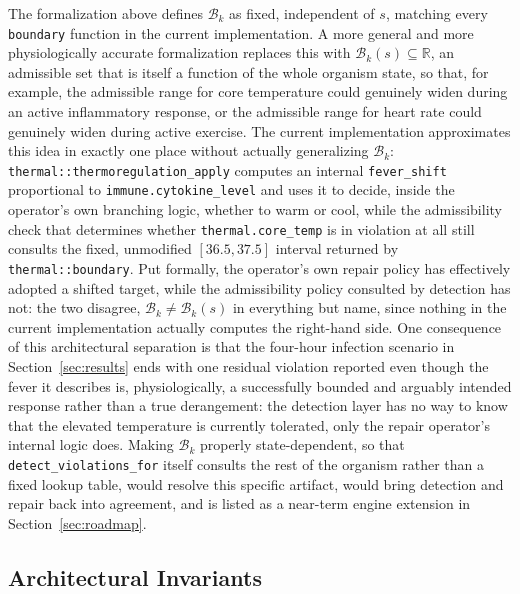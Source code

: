 \documentclass[11pt]{article}
\begin{document}
The formalization above defines $\mathcal B_k$ as fixed, independent of $s$, matching every \texttt{boundary} function in the current implementation. A more general and more physiologically accurate formalization replaces this with $\mathcal B_k(s) \subseteq \mathbb R$, an admissible set that is itself a function of the whole organism state, so that, for example, the admissible range for core temperature could genuinely widen during an active inflammatory response, or the admissible range for heart rate could genuinely widen during active exercise. The current implementation approximates this idea in exactly one place without actually generalizing $\mathcal B_k$: \texttt{thermal::thermoregulation\_apply} computes an internal \texttt{fever\_shift} proportional to \texttt{immune.cytokine\_level} and uses it to decide, inside the operator's own branching logic, whether to warm or cool, while the admissibility check that determines whether \texttt{thermal.core\_temp} is in violation at all still consults the fixed, unmodified $[36.5, 37.5]$ interval returned by \texttt{thermal::boundary}. Put formally, the operator's own repair policy has effectively adopted a shifted target, while the admissibility policy consulted by detection has not: the two disagree, $\mathcal B_k \neq \mathcal B_k(s)$ in everything but name, since nothing in the current implementation actually computes the right-hand side. One consequence of this architectural separation is that the four-hour infection scenario in Section~\ref{sec:results} ends with one residual violation reported even though the fever it describes is, physiologically, a successfully bounded and arguably intended response rather than a true derangement: the detection layer has no way to know that the elevated temperature is currently tolerated, only the repair operator's internal logic does. Making $\mathcal B_k$ properly state-dependent, so that \texttt{detect\_violations\_for} itself consults the rest of the organism rather than a fixed lookup table, would resolve this specific artifact, would bring detection and repair back into agreement, and is listed as a near-term engine extension in Section~\ref{sec:roadmap}.

\subsection{Architectural Invariants}
\end{document}
